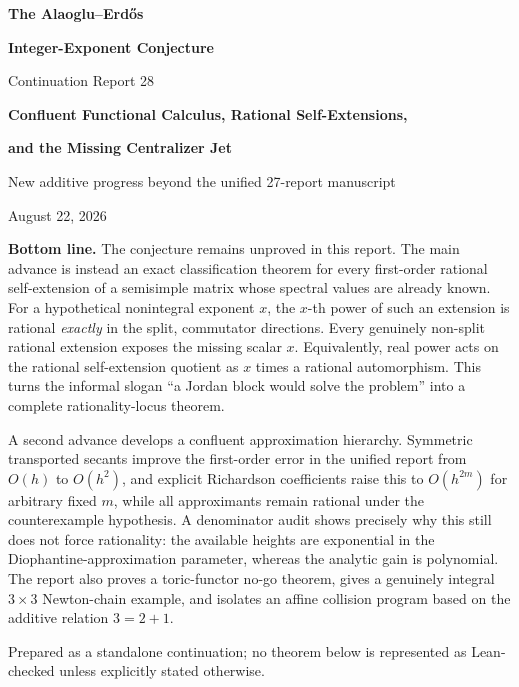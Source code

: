 \documentclass[11pt,oneside]{article}
\theoremstyle{definition}
\theoremstyle{remark}
\begin{document}

\begin{titlepage}
\centering
\vspace*{0.55cm}
{\Huge\bfseries The Alaoglu--Erd\H{o}s\par}
\vspace{0.12cm}
{\Huge\bfseries Integer-Exponent Conjecture\par}
\vspace{0.65cm}
{\LARGE Continuation Report 28\par}
\vspace{0.18cm}
{\Large\bfseries Confluent Functional Calculus, Rational Self-Extensions,\par}
\vspace{0.08cm}
{\Large\bfseries and the Missing Centralizer Jet\par}
\vspace{0.8cm}
{\large New additive progress beyond the unified 27-report manuscript\par}
\vspace{0.22cm}
{\large August 22, 2026\par}
\vfill
\begin{minipage}{0.91\textwidth}
\small
\textbf{Bottom line.}
The conjecture remains unproved in this report.  The main advance is instead an exact
classification theorem for every first-order rational self-extension of a semisimple matrix
whose spectral values are already known.  For a hypothetical nonintegral exponent $x$, the
$x$-th power of such an extension is rational \emph{exactly} in the split, commutator
directions.  Every genuinely non-split rational extension exposes the missing scalar $x$.
Equivalently, real power acts on the rational self-extension quotient as $x$ times a rational
automorphism.  This turns the informal slogan ``a Jordan block would solve the problem'' into
a complete rationality-locus theorem.

A second advance develops a confluent approximation hierarchy.  Symmetric transported secants
improve the first-order error in the unified report from $O(h)$ to $O(h^2)$, and explicit
Richardson coefficients raise this to $O(h^{2m})$ for arbitrary fixed $m$, while all
approximants remain rational under the counterexample hypothesis.  A denominator audit shows
precisely why this still does not force rationality: the available heights are exponential in
the Diophantine-approximation parameter, whereas the analytic gain is polynomial.  The report
also proves a toric-functor no-go theorem, gives a genuinely integral $3\times3$ Newton-chain
example, and isolates an affine collision program based on the additive relation $3=2+1$.
\end{minipage}
\vfill
{\small Prepared as a standalone continuation; no theorem below is represented as Lean-checked
unless explicitly stated otherwise.\par}
\end{titlepage}
\end{document}
